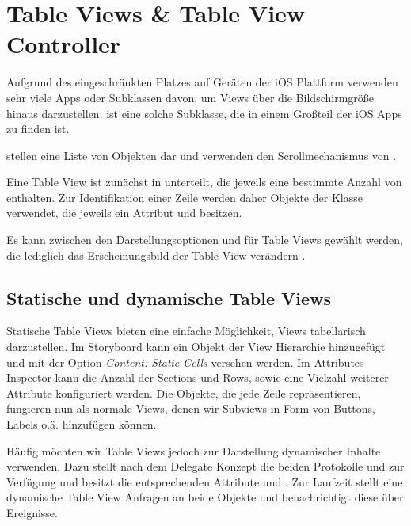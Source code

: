 \documentclass[parskip=half, final]{scrreprt}
\begin{document}
\section{Table Views \& Table View Controller}

Aufgrund des eingeschränkten Platzes auf Geräten der iOS Plattform verwenden sehr viele Apps  oder Subklassen davon, um Views über die Bildschirmgröße hinaus darzustellen.  ist eine solche Subklasse, die in einem Großteil der iOS Apps zu finden ist.

 stellen eine Liste von  Objekten dar und verwenden den Scrollmechanismus von .

Eine Table View ist zunächst in  unterteilt, die jeweils eine bestimmte Anzahl von  enthalten. Zur Identifikation einer Zeile werden daher Objekte der  Klasse verwendet, die jeweils ein Attribut  und  besitzen.

Es kann zwischen den Darstellungsoptionen  und  für Table Views gewählt werden, die lediglich das Erscheinungsbild der Table View verändern .


\subsection{Statische und dynamische Table Views}

Statische Table Views bieten eine einfache Möglichkeit, Views tabellarisch darzustellen. Im Storyboard kann ein  Objekt der View Hierarchie hinzugefügt und mit der Option \emph{Content: Static Cells} versehen werden. Im Attributes Inspector kann die Anzahl der Sections und Rows, sowie eine Vielzahl weiterer Attribute konfiguriert werden. Die  Objekte, die jede Zeile repräsentieren, fungieren nun als normale Views, denen wir Subviews in Form von Buttons, Labels o.ä. hinzufügen können.

Häufig möchten wir Table Views jedoch zur Darstellung dynamischer Inhalte verwenden. Dazu stellt  nach dem Delegate Konzept die beiden Protokolle  und  zur Verfügung und besitzt die entsprechenden Attribute  und . Zur Laufzeit stellt eine dynamische Table View Anfragen an beide Objekte und benachrichtigt diese über Ereignisse.
\end{document}
